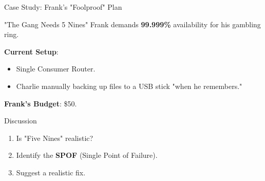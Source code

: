 \documentclass[aspectratio=169]{beamer}  %
\begin{document}
\begin{frame}{Case Study: Frank's "Foolproof" Plan}
    \begin{casestudy}{"The Gang Needs 5 Nines"}
        \small
        Frank demands \textbf{99.999\%} availability for his gambling ring.
        
        \vspace{0.2em}
        \textbf{Current Setup}:
        \begin{itemize}
            \item Single Consumer Router.
            \item Charlie manually backing up files to a USB stick "when he remembers."
        \end{itemize}
        \textbf{Frank's Budget}: \$50.
    \end{casestudy}
    \begin{block}{Discussion}
        \small
        \begin{enumerate}
            \item Is "Five Nines" realistic?
            \item Identify the \textbf{SPOF} (Single Point of Failure).
            \item Suggest a realistic fix.
        \end{enumerate}
    \end{block}
\end{frame}
\end{document}
